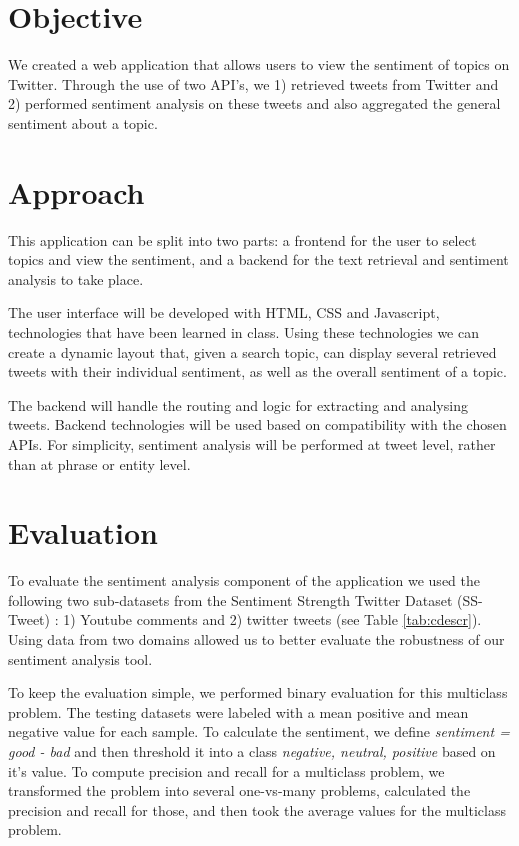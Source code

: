 \section{Objective}
We created a web application that allows users to view the sentiment of topics on Twitter. Through the use of two API’s, we 1) retrieved tweets from Twitter and 2) performed sentiment analysis on these tweets and also aggregated the general sentiment about a topic. 

\section{Approach}
This application can be split into two parts: a frontend for the user to select topics and view the sentiment, and a backend for the text retrieval and sentiment analysis to take place. 

The user interface will be developed with HTML, CSS and Javascript, technologies that have been learned in class. Using these technologies we can create a dynamic layout that, given a search topic, can display several retrieved tweets with their individual sentiment, as well as the overall sentiment of a topic.

The backend will handle the routing and logic for extracting and analysing tweets. Backend technologies will be used based on compatibility with the chosen APIs. For simplicity, sentiment analysis will be performed at tweet level, rather than at phrase or entity level. 

\section{Evaluation}
To evaluate the sentiment analysis component of the application we used the following two sub-datasets from the Sentiment Strength Twitter Dataset (SS-Tweet) \cite{saif2013evaluation}: 1) Youtube comments and 2) twitter tweets (see Table \ref{tab:cdescr}). Using data from two domains allowed us to better evaluate the robustness of our sentiment analysis tool. 

To keep the evaluation simple, we performed binary evaluation for this multiclass problem. 
The testing datasets were labeled with a mean positive and mean negative value for each sample. To calculate the sentiment, we define {\em sentiment = good - bad} and then threshold it into a class {\em negative, neutral, positive} based on it's value.
To compute precision and recall for a multiclass problem, we transformed the problem into several one-vs-many problems, calculated the precision and recall for those, and then took the average values for the multiclass problem.

